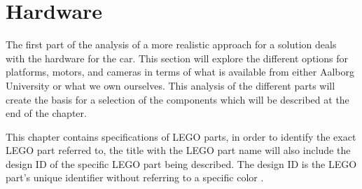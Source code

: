 \section{Hardware}\label{sec:actualHardwareIntro}
The first part of the analysis of a more realistic approach for a solution deals with the hardware for the car.
This section will explore the different options for platforms, motors, and cameras in terms of what is available from either Aalborg University or what we own ourselves.
This analysis of the different parts will create the basis for a selection of the components which will be described at the end of the chapter.

This chapter contains specifications of LEGO parts, in order to identify the exact LEGO part referred to, the title with the LEGO part name will also include the design ID of the specific LEGO part being described.
The design ID is the LEGO part's unique identifier without referring to a specific color \cite{lego_identifying_legoparts}.
